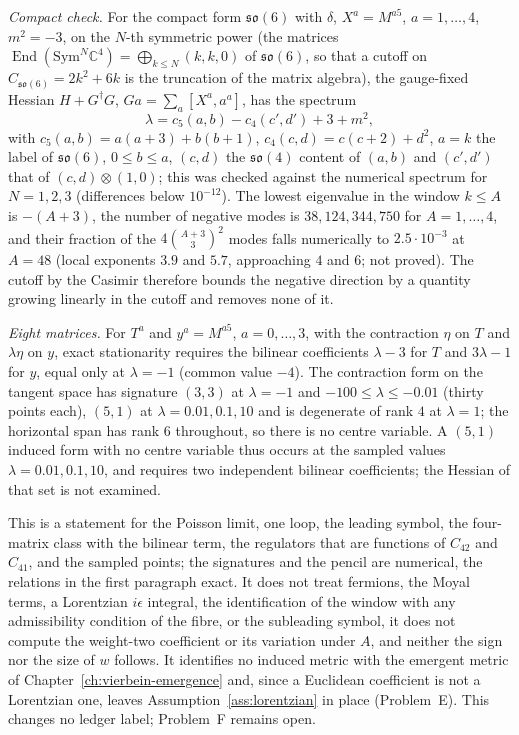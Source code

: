 \emph{Compact check.} For the compact form \(\mathfrak{so}(6)\) with \(\delta\), \(X^a=M^{a5}\), \(a=1,\dots,4\), \(m^2=-3\), on the \(N\)-th symmetric power (the matrices \(\operatorname{End}(\mathrm{Sym}^N\mathbb C^4)=\bigoplus_{k\le N}(k,k,0)\) of \(\mathfrak{so}(6)\), so that a cutoff on \(C_{\mathfrak{so}(6)}=2k^2+6k\) is the truncation of the matrix algebra), the gauge-fixed Hessian \(H+G^\dagger G\), \(Ga=\sum_a[X^a,a^a]\), has the spectrum
\[
\lambda=c_5(a,b)-c_4(c',d')+3+m^2,
\]
with \(c_5(a,b)=a(a+3)+b(b+1)\), \(c_4(c,d)=c(c+2)+d^2\), \(a=k\) the label of \(\mathfrak{so}(6)\), \(0\le b\le a\), \((c,d)\) the \(\mathfrak{so}(4)\) content of \((a,b)\) and \((c',d')\) that of \((c,d)\otimes(1,0)\); this was checked against the numerical spectrum for \(N=1,2,3\) (differences below \(10^{-12}\)). The lowest eigenvalue in the window \(k\le A\) is \(-(A+3)\), the number of negative modes is \(38,124,344,750\) for \(A=1,\dots,4\), and their fraction of the \(4\binom{A+3}{3}^2\) modes falls numerically to \(2.5\cdot10^{-3}\) at \(A=48\) (local exponents \(3.9\) and \(5.7\), approaching \(4\) and \(6\); not proved). The cutoff by the Casimir therefore bounds the negative direction by a quantity growing linearly in the cutoff and removes none of it.

\emph{Eight matrices.} For \(T^a\) and \(y^a=M^{a5}\), \(a=0,\dots,3\), with the contraction \(\eta\) on \(T\) and \(\lambda\eta\) on \(y\), exact stationarity requires the bilinear coefficients \(\lambda-3\) for \(T\) and \(3\lambda-1\) for \(y\), equal only at \(\lambda=-1\) (common value \(-4\)). The contraction form on the tangent space has signature \((3,3)\) at \(\lambda=-1\) and \(-100\le\lambda\le-0.01\) (thirty points each), \((5,1)\) at \(\lambda=0.01,0.1,10\) and is degenerate of rank \(4\) at \(\lambda=1\); the horizontal span has rank \(6\) throughout, so there is no centre variable. A \((5,1)\) induced form with no centre variable thus occurs at the sampled values \(\lambda=0.01,0.1,10\), and requires two independent bilinear coefficients; the Hessian of that set is not examined.

This is a statement for the Poisson limit, one loop, the leading symbol, the four-matrix class with the bilinear term, the regulators that are functions of \(C_{42}\) and \(C_{41}\), and the sampled points; the signatures and the pencil are numerical, the relations in the first paragraph exact. It does not treat fermions, the Moyal terms, a Lorentzian \(i\epsilon\) integral, the identification of the window with any admissibility condition of the fibre, or the subleading symbol, it does not compute the weight-two coefficient or its variation under \(A\), and neither the sign nor the size of \(w\) follows. It identifies no induced metric with the emergent metric of Chapter~\ref{ch:vierbein-emergence} and, since a Euclidean coefficient is not a Lorentzian one, leaves Assumption~\ref{ass:lorentzian} in place (Problem~E). This changes no ledger label; Problem~F remains open.

